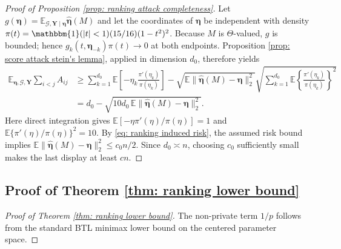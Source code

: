 \documentclass[letterpaper,12pt]{article}
\numberwithin{equation}{section}
\theoremstyle{plain}
\numberwithin{Theorem}{section}
\numberwithin{proposition}{section}
\numberwithin{Lemma}{section}
{
	\theoremstyle{definition}
	\newtheorem{Definition}{Definition}
	\newtheorem{example}{Example}
	\numberwithin{example}{section}
	\newtheorem{fact}{Fact}
	\numberwithin{fact}{section}
	\newtheorem{remark}{Remark}
}
\newcommand{\1}{\mathbbm{1}}
\def\E{\mathbb{E}}
\begin{document}
{\begin{proof}[Proof of Proposition \ref{prop: ranking attack completeness}]
Let $g(\bm\eta)=\E_{\mathcal G,\bm Y\mid\bm\eta}\widehat{\bm\eta}(M)$ and let the coordinates of $\bm\eta$ be independent with density
$\pi(t)=\1(|t|<1)(15/16)(1-t^2)^2$. Because $M$ is $\Theta$-valued, $g$ is bounded; hence $g_k(t,\bm\eta_{-k})\pi(t)\to0$ at both endpoints. Proposition \ref{prop: score attack stein's lemma}, applied in dimension $d_0$, therefore yields
\begin{align*}
\E_{\bm\eta,\mathcal G,\bm Y}\sum_{i<j}A_{ij}
&\geq\sum_{k=1}^{d_0}\E\left[-\eta_k\frac{\pi'(\eta_k)}{\pi(\eta_k)}\right]
-\sqrt{\E\|\widehat{\bm\eta}(M)-\bm\eta\|_2^2}
\sqrt{\sum_{k=1}^{d_0}\E\left\{\frac{\pi'(\eta_k)}{\pi(\eta_k)}\right\}^2}\\
&=d_0-\sqrt{10d_0\,\E\|\widehat{\bm\eta}(M)-\bm\eta\|_2^2}.
\end{align*}
Here direct integration gives
$\E[-\eta\pi'(\eta)/\pi(\eta)]=1$ and
$\E\{\pi'(\eta)/\pi(\eta)\}^2=10$. By \eqref{eq: ranking induced risk}, the assumed risk bound implies
$\E\|\widehat{\bm\eta}(M)-\bm\eta\|_2^2\leq c_0n/2$. Since $d_0\asymp n$, choosing $c_0$ sufficiently small makes the last display at least $cn$.
\end{proof}

\subsection{Proof of Theorem \ref{thm: ranking lower bound}}\label{sec: proof of thm: ranking lower bound}
\begin{proof}[Proof of Theorem \ref{thm: ranking lower bound}]
The non-private term $1/p$ follows from the standard BTL minimax lower bound \cite{negahban2017rank, shah2015estimation} on the centered parameter space.


\end{proof}}
\end{document}
